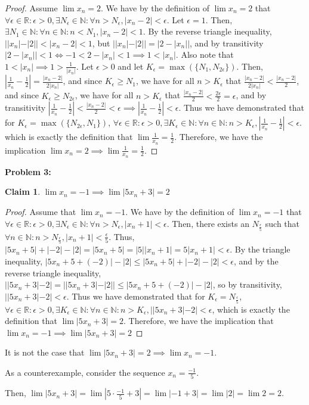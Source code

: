 \documentclass{article}
\newcommand{\reals}{\ensuremath{\mathbb{R}}}
\newcommand{\nats}{\ensuremath{\mathbb{N}}}
\newcommand{\eps}{\ensuremath{\epsilon}}
\newtheorem{clm}{Claim}
\begin{document}
\begin{proof}
	Assume $\lim x_n = 2$.
	We have by the definition of $\lim x_n = 2$
	that $\forall \eps \in \reals : \eps > 0, \exists N_\eps \in \nats: \forall n > N_\eps,
	|x_n - 2| < \eps$.
	Let $\eps = 1$.
	Then, $\exists N_1 \in \nats: \forall n \in \nats: n < N_1, |x_n - 2| < 1$.
	By the reverse triangle inequality,
	$||x_n| - |2|| < | x_n - 2| < 1$,
	but $||x_n| - |2|| = |2 - |x_n||$,
	and by transitivity $|2 - |x_n|| < 1 \iff -1 < 2 - |x_n| < 1 \implies 1 < |x_n|$.
	Also note that $1 < |x_n| \implies 1 > \frac{1}{|x_n|}$.
	Let $\eps > 0$ and let $K_\eps = \max(\{N_1, N_{2\eps}\})$.
	Then, $|\frac{1}{x_n} - \frac{1}{2}| = \frac{|x_n - 2|}{2|x_n|}$,
	and since $K_\eps \geq N_1$, we have for all $n > K_\eps$
	that $\frac{|x_n - 2|}{2|x_n|} < \frac{|x_n - 2|}{2}$,
	and since $K_\eps \geq N_{2\eps}$, we have for all $n > K_\eps$
	that $\frac{|x_n - 2|}{2} < \frac{2\eps}{2} = \eps$,
	and by transitivity $|\frac{1}{x_n} - \frac{1}{2}| < \frac{|x_n - 2|}{2} < \eps
	\implies |\frac{1}{x_n} - \frac{1}{2}| < \eps$.
	Thus we have demonstrated that
	for $K_\eps = \max(\{N_{2\eps}, N_1\})$,
	$\forall \eps \in \reals: \eps > 0, \exists K_\eps \in \nats: \forall n \in \nats: n > K_\eps,
	|\frac{1}{x_n} - \frac{1}{2}| < \eps$.
	which is exactly the definition that $\lim\frac{1}{x_n} = \frac{1}{2}$.
	Therefore, we have the implication $\lim x_n = 2 \implies \lim \frac{1}{x_n} = \frac{1}{2}$.
\end{proof}

\textbf{Problem 3:}

\begin{clm}
	$\lim x_n = - 1 \implies \lim |5x_n + 3| = 2$
\end{clm}

\begin{proof}
	Assume that $\lim x_n = - 1$.
	We have by the definition of $\lim x_n = -1$
	that $\forall \eps \in \reals : \eps > 0, \exists N_\eps \in \nats: \forall n > N_\eps,
	| x_n + 1 | < \eps$.
	Then, there exists an $N_{\frac{\eps}{5}}$
	such that $\forall n \in \nats : n > N_{\frac{\eps}{5}}, | x_n + 1 | < \frac{\eps}{5}$.
	Thus, $|5x_n + 5| + |-2| - |2| = |5x_n + 5| = |5||x_n + 1| = 5|x_n + 1| < \eps$.
	By the triangle inequality,
	$|5x_n + 5 + (-2)| - |2| \le |5x_n + 5| + |-2| - |2| < \eps$,
	and by the reverse triangle inequality,
	$||5x_n + 3| - 2| = ||5x_n + 3| - |2|| \le |5x_n + 5 + (-2)| - |2|$,
	so by transitivity,
	$||5x_n + 3| - 2| < \eps$.
	Thus we have demonstrated that
	for $K_\eps = N_{\frac{\eps}{5}}$,
	$\forall \eps \in \reals: \eps > 0, \exists K_\eps \in \nats: \forall n \in \nats: n > K_\eps,
	||5x_n + 3| - 2| < \eps$,
	which is exactly the definition that $\lim|5x_n + 3| = 2$.
	Therefore, we have the implication that 
	$\lim x_n = - 1 \implies \lim |5x_n + 3| = 2$
\end{proof}

It is not the case that $\lim |5x_n + 3| = 2 \implies \lim x_n = -1$.

As a counterexample, consider the sequence $x_n = \frac{-1}{5}$.

Then, $\lim |5x_n + 3| = \lim |5 \cdot \frac{-1}{5} + 3| = \lim|-1 + 3| = \lim|2| = \lim 2 = 2$.
\end{document}
